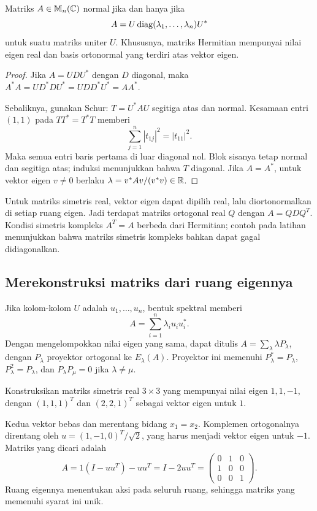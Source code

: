 \begin{teorema}
    Matriks $A\in\mathbb{M}_n(\mathbb{C})$ normal jika dan hanya jika
    \[
        A=U\operatorname{diag}(\lambda_1,\ldots,\lambda_n)U^*
    \]
    untuk suatu matriks uniter $U$.
    Khususnya, matriks Hermitian mempunyai nilai eigen real dan
    basis ortonormal yang terdiri atas vektor eigen.
\end{teorema}
\begin{proof}
    Jika $A=UDU^*$ dengan $D$ diagonal, maka
    $A^*A=UD^*DU^*=UDD^*U^*=AA^*$.

    Sebaliknya, gunakan Schur: $T=U^*AU$ segitiga atas dan normal.
    Kesamaan entri $(1,1)$ pada $TT^*=T^*T$ memberi
    \[
        \sum_{j=1}^n|t_{1j}|^2=|t_{11}|^2.
    \]
    Maka semua entri baris pertama di luar diagonal nol.
    Blok sisanya tetap normal dan segitiga atas; induksi menunjukkan
    bahwa $T$ diagonal.
    Jika $A=A^*$, untuk vektor eigen $v\ne0$ berlaku
    $\lambda=v^*Av/(v^*v)\in\mathbb{R}$.
\end{proof}

Untuk matriks simetris real, vektor eigen dapat dipilih real, lalu
diortonormalkan di setiap ruang eigen. Jadi terdapat matriks
ortogonal real $Q$ dengan $A=QDQ^T$.
Kondisi simetris kompleks $A^T=A$ berbeda dari Hermitian;
contoh pada latihan menunjukkan bahwa matriks simetris kompleks
bahkan dapat gagal didiagonalkan.

\subsection{Merekonstruksi matriks dari ruang eigennya}

Jika kolom-kolom $U$ adalah $u_1,\ldots,u_n$, bentuk spektral memberi
\[
    A=\sum_{i=1}^n\lambda_i u_iu_i^*.
\]
Dengan mengelompokkan nilai eigen yang sama, dapat ditulis
$A=\sum_\lambda\lambda P_\lambda$, dengan $P_\lambda$ proyektor
ortogonal ke $E_\lambda(A)$. Proyektor ini memenuhi
$P_\lambda^*=P_\lambda$, $P_\lambda^2=P_\lambda$, dan
$P_\lambda P_\mu=0$ jika $\lambda\ne\mu$.

\begin{exam}
    Konstruksikan matriks simetris real $3\times3$ yang mempunyai
    nilai eigen $1,1,-1$, dengan $(1,1,1)^T$ dan $(2,2,1)^T$
    sebagai vektor eigen untuk $1$.
\end{exam}
\begin{solution}
    Kedua vektor bebas dan merentang bidang $x_1=x_2$.
    Komplemen ortogonalnya direntang oleh
    $u=(1,-1,0)^T/\sqrt2$, yang harus menjadi vektor eigen untuk $-1$.
    Matriks yang dicari adalah
    \[
        A=1(I-uu^T)-uu^T=I-2uu^T
        =\begin{pmatrix}0&1&0\\1&0&0\\0&0&1\end{pmatrix}.
    \]
    Ruang eigennya menentukan aksi pada seluruh ruang, sehingga
    matriks yang memenuhi syarat ini unik.
\end{solution}

